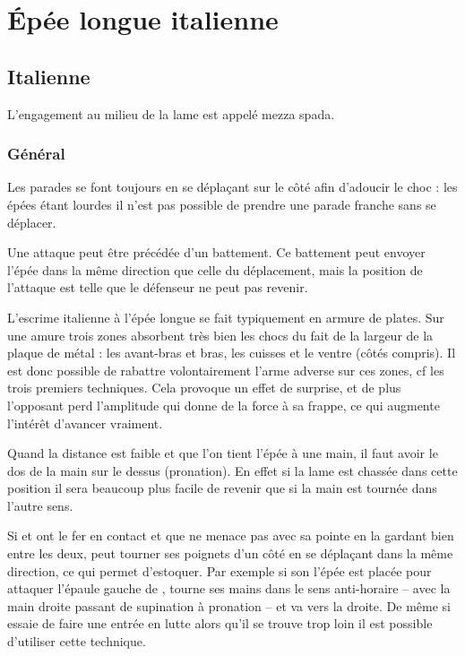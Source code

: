 \chapter{Épée longue italienne}


\section{Italienne}


\begin{definition}

L'engagement au milieu de la lame est appelé mezza spada.
\end{definition}


\subsection{Général}



Les parades se font toujours en se déplaçant sur le côté afin d'adoucir le choc : les épées étant lourdes il n'est pas possible de prendre une parade franche sans se déplacer.

Une attaque peut être précédée d'un battement.
Ce battement peut envoyer l'épée dans la même direction que celle du déplacement, mais la position de l'attaque est telle que le défenseur ne peut pas revenir.

L'escrime italienne à l'épée longue se fait typiquement en armure de plates.
Sur une amure trois zones absorbent très bien les chocs du fait de la largeur de la plaque de métal : les avant-bras et bras, les cuisses et le ventre (côtés compris).
Il est donc possible de rabattre volontairement l'arme adverse sur ces zones, cf les trois premiers techniques.
Cela provoque un effet de surprise, et de plus l'opposant perd l'amplitude qui donne de la force à sa frappe, ce qui augmente l'intérêt d'avancer vraiment.

Quand la distance est faible et que l'on tient l'épée à une main, il faut avoir le dos de la main sur le dessus (pronation).
En effet si la lame est chassée dans cette position il sera beaucoup plus facile de revenir que si la main est tournée dans l'autre sens.

Si \A et \D ont le fer en contact et que \A ne menace pas \D avec sa pointe en la gardant bien entre les deux, \D peut tourner ses poignets d'un côté en se déplaçant dans la même direction, ce qui permet d'estoquer.
Par exemple si son l'épée est placée pour attaquer l'épaule gauche de \A, \D tourne ses mains dans le sens anti-horaire – avec la main droite passant de supination à pronation – et va vers la droite.
De même si \A essaie de faire une entrée en lutte alors qu'il se trouve trop loin il est possible d'utiliser cette technique.


